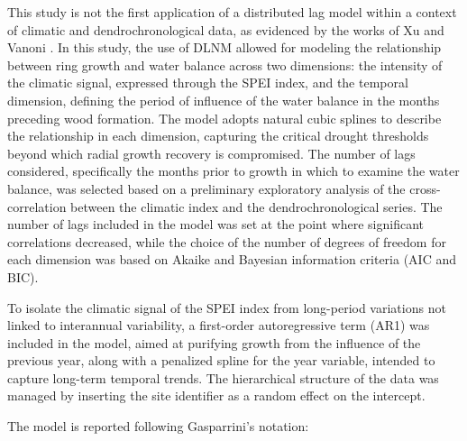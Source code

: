 \documentclass[12pt, a4paper]{article}
\begin{document}
This study is not the first application of a distributed lag model within a context of climatic and dendrochronological data, as evidenced by the works of Xu and Vanoni \parencite{xu2024, vanoni2016}. In this study, the use of DLNM allowed for modeling the relationship between ring growth and water balance across two dimensions: the intensity of the climatic signal, expressed through the SPEI index, and the temporal dimension, defining the period of influence of the water balance in the months preceding wood formation. The model adopts natural cubic splines to describe the relationship in each dimension, capturing the critical drought thresholds beyond which radial growth recovery is compromised. The number of lags considered, specifically the months prior to growth in which to examine the water balance, was selected based on a preliminary exploratory analysis of the cross-correlation between the climatic index and the dendrochronological series. The number of lags included in the model was set at the point where significant correlations decreased, while the choice of the number of degrees of freedom for each dimension was based on Akaike and Bayesian information criteria (AIC and BIC).

To isolate the climatic signal of the SPEI index from long-period variations not linked to interannual variability, a first-order autoregressive term (AR1) was included in the model, aimed at purifying growth from the influence of the previous year, along with a penalized spline for the year variable, intended to capture long-term temporal trends. The hierarchical structure of the data was managed by inserting the site identifier as a random effect on the intercept.

The model is reported following Gasparrini’s notation:
\end{document}
